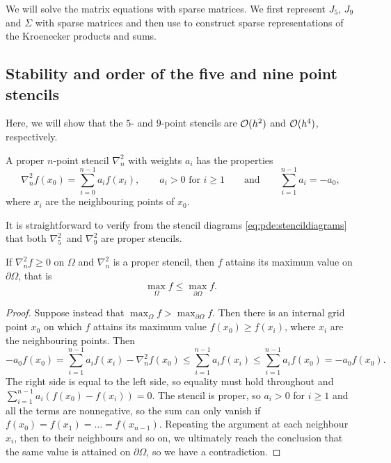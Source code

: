 We will solve the matrix equations with sparse matrices. \cite{scipy_sparse} 
We first represent $J_5$, $J_9$ and $\Sigma$ with sparse matrices and then use \cite{scipy_kron} to construct sparse representations of the Kroenecker products and sums.

\newcommand{\inorm}[1]{
\lVert #1 \rVert_\infty
}

\subsection{Stability and order of the five and nine point stencils}
Here, we will show that the $5$- and $9$-point stencils are $\mathcal{O}(h^2)$ and $\mathcal{O}(h^4)$, respectively.

\begin{definition}
  A proper $n$-point stencil $\nabla_n^2$ with weights $a_i$ has the properties
  \begin{equation*}
  	\nabla_n^2 f(x_0) = \sum_{i=0}^{n-1} a_i f(x_i),
	\qquad 
	a_i > 0 \,\, \text{for} \,\, i \geq 1
	\qquad \text{and} \qquad
	\sum_{i=1}^{n-1} a_i = -a_0,
  \end{equation*}
  where $x_i$ are the neighbouring points of $x_0$.
\end{definition}

It is straightforward to verify from the stencil diagrams \ref{eq:pde:stencildiagrams} that both $\nabla_5^2$ and $\nabla_9^2$ are proper stencils.

\begin{lemma}\label{pde:lemma:max}
If $\nabla_n^2 f \geq 0$ on $\Omega$ and $\nabla_n^2$ is a proper stencil, then $f$ attains its maximum value on $\partial \Omega$, that is
$$
\max_\Omega f  \leq \max_{\partial \Omega} f.
$$
\end{lemma}
\begin{proof}
Suppose instead that $\max_\Omega f > \max_{\partial \Omega} f$.
Then there is an internal grid point $x_0$ on which $f$ attains its maximum value $f(x_0) \geq f(x_i)$, where $x_i$ are the neighbouring points.
Then
\begin{equation}
  -a_0 f(x_0)
  = \sum_{i=1}^{n-1} a_i f(x_i) - \nabla_n^2 f(x_0)
  \leq \sum_{i=1}^{n-1} a_i f(x_i)
  \leq \sum_{i=1}^{n-1} a_i f(x_0)
  = -a_0 f(x_0).
\end{equation}
The right side is equal to the left side, so equality must hold throughout and $\sum_{i=1}^{n-1} a_i (f(x_0) - f(x_i)) = 0$.
The stencil is proper, so $a_i > 0$ for $i \geq 1$ and all the terms are nonnegative, so the sum can only vanish if $f(x_0) = f(x_1) = \dots = f(x_{n-1})$.
Repeating the argument at each neighbour $x_i$, then to their neighbours and so on, we ultimately reach the conclusion that the same value is attained on $\partial \Omega$, so we have a contradiction.
\end{proof}

